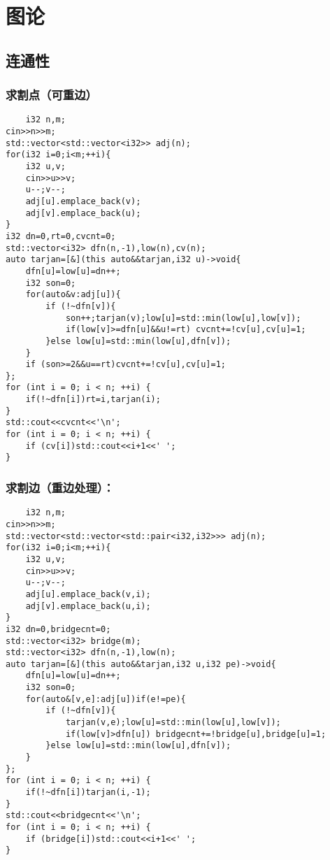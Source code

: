 \documentclass[UTF8]{ctexart}
\begin{document}
\section{图论}
\subsection{连通性}
\subsubsection{求割点（可重边）}
\begin{lstlisting}
    i32 n,m;
cin>>n>>m;
std::vector<std::vector<i32>> adj(n);
for(i32 i=0;i<m;++i){
    i32 u,v;
    cin>>u>>v;
    u--;v--;
    adj[u].emplace_back(v);
    adj[v].emplace_back(u);
}
i32 dn=0,rt=0,cvcnt=0;
std::vector<i32> dfn(n,-1),low(n),cv(n);
auto tarjan=[&](this auto&&tarjan,i32 u)->void{
    dfn[u]=low[u]=dn++;
    i32 son=0;
    for(auto&v:adj[u]){
        if (!~dfn[v]){
            son++;tarjan(v);low[u]=std::min(low[u],low[v]);
            if(low[v]>=dfn[u]&&u!=rt) cvcnt+=!cv[u],cv[u]=1;
        }else low[u]=std::min(low[u],dfn[v]);
    }
    if (son>=2&&u==rt)cvcnt+=!cv[u],cv[u]=1;
};
for (int i = 0; i < n; ++i) {
    if(!~dfn[i])rt=i,tarjan(i);
}
std::cout<<cvcnt<<'\n';
for (int i = 0; i < n; ++i) {
    if (cv[i])std::cout<<i+1<<' ';
}
\end{lstlisting}
\subsubsection{求割边（重边处理）：}
\begin{lstlisting}
    i32 n,m;
cin>>n>>m;
std::vector<std::vector<std::pair<i32,i32>>> adj(n);
for(i32 i=0;i<m;++i){
    i32 u,v;
    cin>>u>>v;
    u--;v--;
    adj[u].emplace_back(v,i);
    adj[v].emplace_back(u,i);
}
i32 dn=0,bridgecnt=0;
std::vector<i32> bridge(m);
std::vector<i32> dfn(n,-1),low(n);
auto tarjan=[&](this auto&&tarjan,i32 u,i32 pe)->void{
    dfn[u]=low[u]=dn++;
    i32 son=0;
    for(auto&[v,e]:adj[u])if(e!=pe){
        if (!~dfn[v]){
            tarjan(v,e);low[u]=std::min(low[u],low[v]);
            if(low[v]>dfn[u]) bridgecnt+=!bridge[u],bridge[u]=1;
        }else low[u]=std::min(low[u],dfn[v]);
    }
};
for (int i = 0; i < n; ++i) {
    if(!~dfn[i])tarjan(i,-1);
}
std::cout<<bridgecnt<<'\n';
for (int i = 0; i < n; ++i) {
    if (bridge[i])std::cout<<i+1<<' ';
} 
\end{lstlisting}
\end{document}
